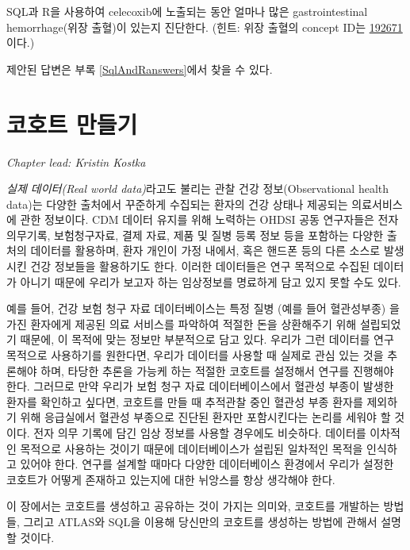 \documentclass[11pt]{book}
\theoremstyle{definition}
\theoremstyle{definition}
\theoremstyle{definition}
\theoremstyle{remark}
\begin{document}
\protect\hypertarget{exr:exerciseGiBleedsDuringCelecoxib}{}{\label{exr:exerciseGiBleedsDuringCelecoxib}
}SQL과 R을 사용하여 celecoxib에 노출되는 동안 얼마나 많은
gastrointestinal hemorrhage(위장 출혈)이 있는지 진단한다. (힌트: 위장
출혈의 concept ID는
\href{http://athena.ohdsi.org/search-terms/terms/192671}{192671}이다.)

제안된 답변은 부록 \ref{SqlAndRanswers}에서 찾을 수 있다.

\chapter{코호트 만들기}\label{Cohorts}

\emph{Chapter lead: Kristin Kostka}

\emph{실제 데이터(Real world data)}라고도 불리는 관찰 건강
정보(Observational health data)는 다양한 출처에서 꾸준하게 수집되는
환자의 건강 상태나 제공되는 의료서비스에 관한 정보이다. CDM 데이터
유지를 위해 노력하는 OHDSI 공동 연구자들은 전자 의무기록, 보험청구자료,
결제 자료, 제품 및 질병 등록 정보 등을 포함하는 다양한 출처의 데이터를
활용하며, 환자 개인이 가정 내에서, 혹은 핸드폰 등의 다른 소스로 발생시킨
건강 정보들을 활용하기도 한다. 이러한 데이터들은 연구 목적으로 수집된
데이터가 아니기 때문에 우리가 보고자 하는 임상정보를 명료하게 담고 있지
못할 수도 있다.

예를 들어, 건강 보험 청구 자료 데이터베이스는 특정 질병 (예를 들어
혈관성부종) 을 가진 환자에게 제공된 의료 서비스를 파악하여 적절한 돈을
상환해주기 위해 설립되었기 때문에, 이 목적에 맞는 정보만 부분적으로 담고
있다. 우리가 그런 데이터를 연구 목적으로 사용하기를 원한다면, 우리가
데이터를 사용할 때 실제로 관심 있는 것을 추론해야 하며, 타당한 추론을
가능케 하는 적절한 코호트를 설정해서 연구를 진행해야 한다. 그러므로 만약
우리가 보험 청구 자료 데이터베이스에서 혈관성 부종이 발생한 환자를
확인하고 싶다면, 코호트를 만들 때 추적관찰 중인 혈관성 부종 환자를
제외하기 위해 응급실에서 혈관성 부종으로 진단된 환자만 포함시킨다는
논리를 세워야 할 것이다. 전자 의무 기록에 담긴 임상 정보를 사용할
경우에도 비슷하다. 데이터를 이차적인 목적으로 사용하는 것이기 때문에
데이터베이스가 설립된 일차적인 목적을 인식하고 있어야 한다. 연구를
설계할 때마다 다양한 데이터베이스 환경에서 우리가 설정한 코호트가 어떻게
존재하고 있는지에 대한 뉘앙스를 항상 생각해야 한다.

이 장에서는 코호트를 생성하고 공유하는 것이 가지는 의미와, 코호트를
개발하는 방법들, 그리고 ATLAS와 SQL을 이용해 당신만의 코호트를 생성하는
방법에 관해서 설명할 것이다.
\end{document}

